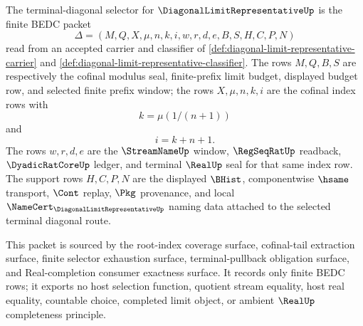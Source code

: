 \begin{definition}
\label{def:diagonal-limit-representative-terminal-diagonal-selector}
The terminal-diagonal selector for $\DiagonalLimitRepresentativeUp$ is the finite BEDC packet
$$
\Delta=(M,Q,X,\mu,n,k,i,w,r,d,e,B,S,H,C,P,N)
$$
read from an accepted carrier and classifier of \autoref{def:diagonal-limit-representative-carrier} and \autoref{def:diagonal-limit-representative-classifier}. The rows $M,Q,B,S$ are respectively the cofinal modulus seal, finite-prefix limit budget, displayed budget row, and selected finite prefix window; the rows $X,\mu,n,k,i$ are the cofinal index rows with
$$
k=\mu(1/(n+1))
$$
and
$$
i=k+n+1.
$$
The rows $w,r,d,e$ are the $\StreamNameUp$ window, $\RegSeqRatUp$ readback, $\DyadicRatCoreUp$ ledger, and terminal $\RealUp$ seal for that same index row. The support rows $H,C,P,N$ are the displayed $\BHist$, componentwise $\hsame$ transport, $\Cont$ replay, $\Pkg$ provenance, and local $\NameCert_{\DiagonalLimitRepresentativeUp}$ naming data attached to the selected terminal diagonal route.

This packet is sourced by the root-index coverage surface, cofinal-tail extraction surface, finite selector exhaustion surface, terminal-pullback obligation surface, and Real-completion consumer exactness surface. It records only finite BEDC rows; it exports no host selection function, quotient stream equality, host real equality, countable choice, completed limit object, or ambient $\RealUp$ completeness principle.
\end{definition}

